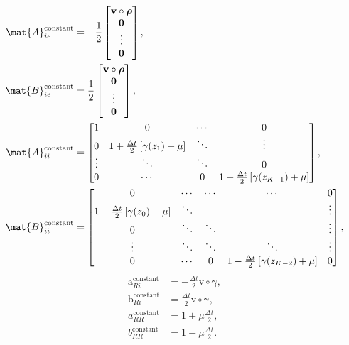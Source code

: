 \documentclass{jpmarticle}
\renewcommand{\vec}[1]{\boldsymbol{\mathrm{#1}}}
\begin{document}
\begin{equation}
  \begin{split}
    \mat{A}_{ie}^{\text{constant}} &=
    - \frac{1}{2}
    \begin{bmatrix}
      \vec{v} \circ \vec{\rho}
      \\
      \vec{0}
      \\
      \vdots
      \\
      \vec{0}
    \end{bmatrix},
    \\
    \mat{B}_{ie}^{\text{constant}} &=
    \frac{1}{2}
    \begin{bmatrix}
      \vec{v} \circ \vec{\rho}
      \\
      \vec{0}
      \\
      \vdots
      \\
      \vec{0}
    \end{bmatrix},
    \\
    \mat{A}_{ii}^{\text{constant}} &=
    \begin{bmatrix}
      1 & 0 & \cdots & 0
      \\
      0 & 1 + \frac{\Delta t}{2} \left[\gamma(z_1) + \mu\right] &
      \ddots & \vdots
      \\
      \vdots & \ddots & \ddots & 0
      \\
      0 & \cdots & 0 &
      1 + \frac{\Delta t}{2} \left[\gamma(z_{K - 1}) + \mu\right]
    \end{bmatrix},
    \\
    \mat{B}_{ii}^{\text{constant}} &=
    \begin{bmatrix}
      0 & \cdots & \cdots & \cdots & 0
      \\
      1 - \frac{\Delta t}{2} \left[\gamma(z_0) + \mu\right] & \ddots &
      & & \vdots
      \\
      0 & \ddots & \ddots & & \vdots
      \\
      \vdots & \ddots & \ddots & \ddots & \vdots
      \\
      0 & \cdots & 0 &
      1 - \frac{\Delta t}{2} \left[\gamma(z_{K - 2}) + \mu\right] & 0
    \end{bmatrix},
  \end{split}
\end{equation}
\begin{equation}
  \begin{split}
    \vec{a}_{Ri}^{\text{constant}} &=
    - \frac{\Delta t}{2} \vec{v} \circ \vec{\gamma},
    \\
    \vec{b}_{Ri}^{\text{constant}} &=
    \frac{\Delta t}{2} \vec{v} \circ \vec{\gamma},
    \\
    a_{RR}^{\text{constant}} &=
    1 + \mu \frac{\Delta t}{2},
    \\
    b_{RR}^{\text{constant}} &=
    1 - \mu \frac{\Delta t}{2}.
  \end{split}
\end{equation}
\end{document}

